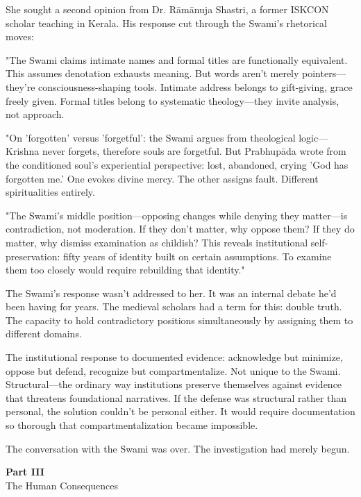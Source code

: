 \documentclass[12pt,twoside]{book}
\makeatletter
\def\cleardoublepage{\clearpage\if@twoside \ifodd\c@page\else\hbox{}\thispagestyle{empty}\newpage\if@twocolumn\hbox{}\newpage\fi\fi\fi}
\makeatother
\begin{document}
She sought a second opinion from Dr. Rāmānuja Shastri, a former ISKCON scholar teaching in Kerala. His response cut through the Swami's rhetorical moves:

"The Swami claims intimate names and formal titles are functionally equivalent. This assumes denotation exhausts meaning. But words aren't merely pointers—they're consciousness-shaping tools. Intimate address belongs to gift-giving, grace freely given. Formal titles belong to systematic theology—they invite analysis, not approach.

"On 'forgotten' versus 'forgetful': the Swami argues from theological logic—Krishna never forgets, therefore souls are forgetful. But Prabhupāda wrote from the conditioned soul's experiential perspective: lost, abandoned, crying 'God has forgotten me.' One evokes divine mercy. The other assigns fault. Different spiritualities entirely.

"The Swami's middle position—opposing changes while denying they matter—is contradiction, not moderation. If they don't matter, why oppose them? If they do matter, why dismiss examination as childish? This reveals institutional self-preservation: fifty years of identity built on certain assumptions. To examine them too closely would require rebuilding that identity."

The Swami's response wasn't addressed to her. It was an internal debate he'd been having for years. The medieval scholars had a term for this: double truth. The capacity to hold contradictory positions simultaneously by assigning them to different domains.

The institutional response to documented evidence: acknowledge but minimize, oppose but defend, recognize but compartmentalize. Not unique to the Swami. Structural—the ordinary way institutions preserve themselves against evidence that threatens foundational narratives. If the defense was structural rather than personal, the solution couldn't be personal either. It would require documentation so thorough that compartmentalization became impossible.

The conversation with the Swami was over. The investigation had merely begun.

\cleardoublepage  %
\pagestyle{empty}
\vspace*{0.20\textheight}
\begin{center}
{\Huge\bfseries Part III}\\[0.5cm]
{\Large The Human Consequences}
\end{center}
\vspace*{\fill}
\cleardoublepage
\vspace*{0.20\textheight}
\end{document}
